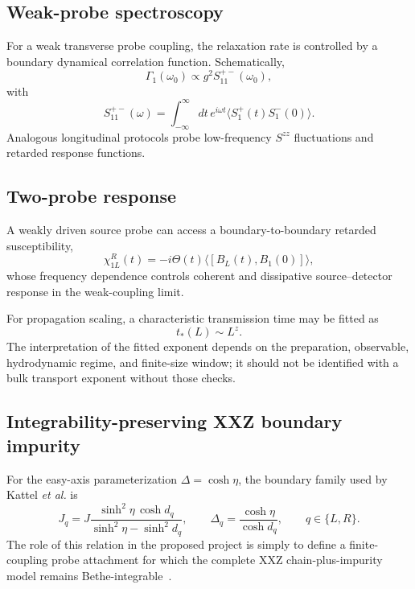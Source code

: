 \documentclass[11pt,a4paper]{article}
\begin{document}
\subsection{Weak-probe spectroscopy}
For a weak transverse probe coupling, the relaxation rate is controlled by a boundary dynamical correlation function.  Schematically,
\begin{equation}
\Gamma_1(\omega_0)\propto g^2 S_{11}^{+-}(\omega_0),
\end{equation}
with
\begin{equation}
S_{11}^{+-}(\omega)=\int_{-\infty}^{\infty}dt\,
e^{i\omega t}\langle S_1^+(t)S_1^-(0)\rangle.
\end{equation}
Analogous longitudinal protocols probe low-frequency $S^{zz}$ fluctuations and retarded response functions.

\subsection{Two-probe response}
A weakly driven source probe can access a boundary-to-boundary retarded susceptibility,
\begin{equation}
\chi_{1L}^{R}(t)=-i\Theta(t)\langle[B_L(t),B_1(0)]\rangle,
\end{equation}
whose frequency dependence controls coherent and dissipative source--detector response in the weak-coupling limit.

For propagation scaling, a characteristic transmission time may be fitted as
\begin{equation}
t_{*}(L)\sim L^z.
\end{equation}
The interpretation of the fitted exponent depends on the preparation, observable, hydrodynamic regime, and finite-size window; it should not be identified with a bulk transport exponent without those checks.

\subsection{Integrability-preserving XXZ boundary impurity}
For the easy-axis parameterization $\Delta=\cosh\eta$, the boundary family used by Kattel \emph{et al.} is
\begin{equation}
J_q=J\frac{\sinh^2\eta\,\cosh d_q}{\sinh^2\eta-\sinh^2d_q},
\qquad
\Delta_q=\frac{\cosh\eta}{\cosh d_q},
\qquad q\in\{L,R\}.
\end{equation}
The role of this relation in the proposed project is simply to define a finite-coupling probe attachment for which the complete XXZ chain-plus-impurity model remains Bethe-integrable~\cite{kattel2025}.
\end{document}
